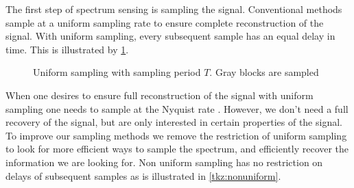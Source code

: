 \documentclass[a4paper, openany, oneside]{memoir}
\begin{document}
The first step of spectrum sensing is sampling the signal. Conventional methods sample at a uniform sampling rate to ensure complete reconstruction of the signal. With uniform sampling, every subsequent sample has an equal delay in time. This is illustrated by \cref{tkz:uniform}.

\begin{figure}[H]
\centering
{}
\caption{Uniform sampling with sampling period $T$. Gray blocks are sampled}\label{tkz:uniform}
\end{figure}

When one desires to ensure full reconstruction of the signal with uniform sampling one needs to sample at the Nyquist rate . However, we don't need a full recovery of the signal, but are only interested in certain properties of the signal. To improve our sampling methods we remove the restriction of uniform sampling to look for more efficient ways to sample the spectrum, and efficiently recover the information we are looking for. Non uniform sampling has no restriction on delays of subsequent samples as is illustrated in \cref{tkz:nonuniform}.
\end{document}
